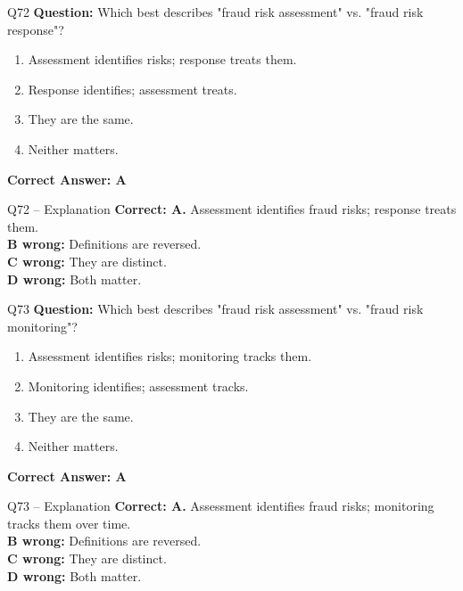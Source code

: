 \documentclass[aspectratio=169,10pt]{beamer}
\begin{document}
	\begin{frame}[t]{Q72}
		\small
		\textbf{Question:} Which best describes "fraud risk assessment" vs. "fraud risk response"?
		\begin{enumerate}[label=\Alph*.,itemsep=1pt,topsep=2pt]
			\item Assessment identifies risks; response treats them.
			\item Response identifies; assessment treats.
			\item They are the same.
			\item Neither matters.
		\end{enumerate}
		\vspace{4pt}
		\textbf{Correct Answer: A}
	\end{frame}
	
	\begin{frame}[t]{Q72 -- Explanation}
		\small
		\textbf{Correct: A.} Assessment identifies fraud risks; response treats them. \\[4pt]
		\textbf{B wrong:} Definitions are reversed. \\[2pt]
		\textbf{C wrong:} They are distinct. \\[2pt]
		\textbf{D wrong:} Both matter.
	\end{frame}
	
	\begin{frame}[t]{Q73}
		\small
		\textbf{Question:} Which best describes "fraud risk assessment" vs. "fraud risk monitoring"?
		\begin{enumerate}[label=\Alph*.,itemsep=1pt,topsep=2pt]
			\item Assessment identifies risks; monitoring tracks them.
			\item Monitoring identifies; assessment tracks.
			\item They are the same.
			\item Neither matters.
		\end{enumerate}
		\vspace{4pt}
		\textbf{Correct Answer: A}
	\end{frame}
	
	\begin{frame}[t]{Q73 -- Explanation}
		\small
		\textbf{Correct: A.} Assessment identifies fraud risks; monitoring tracks them over time. \\[4pt]
		\textbf{B wrong:} Definitions are reversed. \\[2pt]
		\textbf{C wrong:} They are distinct. \\[2pt]
		\textbf{D wrong:} Both matter.
	\end{frame}
	
\end{document}
